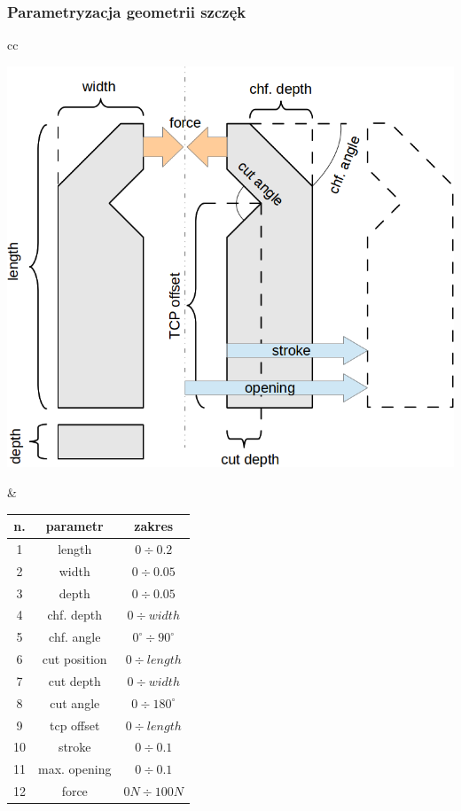 \documentclass[12pt,a4paper,portrait]{beamer}
\begin{document}
\begin{frame}
\frametitle{Parametryzacja geometrii szczęk}
\begin{tabular}{cc}
\begin{minipage}{0.5\textwidth}
\includegraphics[width=1\textwidth]{images/parametrization}
\end{minipage} &
\begin{minipage}{0.5\textwidth}
\begin{tabular}{c|c|c}
\textbf{n.} & \textbf{parametr} & \textbf{zakres} \\ \hline \hline
1 & length & $0 \div 0.2$ \\ \hline
2 & width & $0 \div 0.05$ \\ \hline
3 & depth & $0 \div 0.05$ \\ \hline
4 & chf. depth & $0 \div width$ \\ \hline
5 & chf. angle & $0^\circ \div 90^\circ$ \\ \hline
6 & cut position & $0 \div length$ \\ \hline
7 & cut depth & $0 \div width$ \\ \hline
8 & cut angle & $0 \div 180^\circ$ \\ \hline
9 & tcp offset & $0 \div length$ \\ \hline
10 & stroke & $0 \div 0.1$ \\ \hline
11 & max. opening & $0 \div 0.1$ \\ \hline
12 & force & $0 N \div 100 N$
\end{tabular}
\end{minipage}
\end{tabular}
\end{frame}
\end{document}
